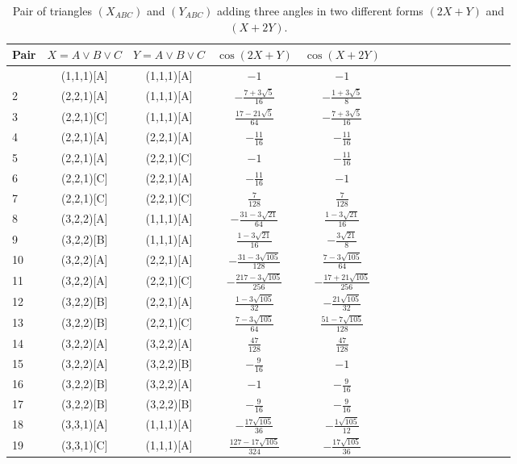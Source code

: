 \documentclass[11pt]{article}
\begin{document}
\begin{longtable}{ | p{1cm}| *{15}{c|} }
\caption{Pair of triangles $(X_{ABC})$ and $(Y_{ABC})$ adding three angles 
in two different forms $(2X+Y)$ and $(X+2Y)$.}\\
\hline
Pair & $X = A \lor B \lor C$ & $Y = A \lor B \lor C$ & $\cos(2X+Y)$ & $\cos(X+2Y)$ \\
\hline\endhead
\hline\endfoot
1 & (1,1,1)[A] & (1,1,1)[A] & $-1$ & $-1$\\
2 & (2,2,1)[A] & (1,1,1)[A] & $-\frac{7+3\sqrt{5}}{16}$ & $-\frac{1+3\sqrt{5}}{8}$\\
3 & (2,2,1)[C] & (1,1,1)[A] & $\frac{17-21\sqrt{5}}{64}$ & $-\frac{7+3\sqrt{5}}{16}$\\
4 & (2,2,1)[A] & (2,2,1)[A] & $-\frac{11}{16}$ & $-\frac{11}{16}$\\
5 & (2,2,1)[A] & (2,2,1)[C] & $-1$ & $-\frac{11}{16}$\\
6 & (2,2,1)[C] & (2,2,1)[A] & $-\frac{11}{16}$ & $-1$\\
7 & (2,2,1)[C] & (2,2,1)[C] & $\frac{7}{128}$ & $\frac{7}{128}$\\
8 & (3,2,2)[A] & (1,1,1)[A] & $-\frac{31-3\sqrt{21}}{64}$ & $\frac{1-3\sqrt{21}}{16}$\\
9 & (3,2,2)[B] & (1,1,1)[A] & $\frac{1-3\sqrt{21}}{16}$ & $-\frac{3\sqrt{21}}{8}$\\
10 & (3,2,2)[A] & (2,2,1)[A] & $-\frac{31-3\sqrt{105}}{128}$ & $\frac{7-3\sqrt{105}}{64}$\\
11 & (3,2,2)[A] & (2,2,1)[C] & $-\frac{217-3\sqrt{105}}{256}$ & $-\frac{17+21\sqrt{105}}{256}$\\
12 & (3,2,2)[B] & (2,2,1)[A] & $\frac{1-3\sqrt{105}}{32}$ & $-\frac{21\sqrt{105}}{32}$\\
13 & (3,2,2)[B] & (2,2,1)[C] & $\frac{7-3\sqrt{105}}{64}$ & $\frac{51-7\sqrt{105}}{128}$\\
14 & (3,2,2)[A] & (3,2,2)[A] & $\frac{47}{128}$ & $\frac{47}{128}$\\
15 & (3,2,2)[A] & (3,2,2)[B] & $-\frac{9}{16}$ & $-1$\\
16 & (3,2,2)[B] & (3,2,2)[A] & $-1$ & $-\frac{9}{16}$\\
17 & (3,2,2)[B] & (3,2,2)[B] & $-\frac{9}{16}$ & $-\frac{9}{16}$\\
18 & (3,3,1)[A] & (1,1,1)[A] & $-\frac{17\sqrt{105}}{36}$ & $-\frac{1\sqrt{105}}{12}$\\
19 & (3,3,1)[C] & (1,1,1)[A] & $\frac{127-17\sqrt{105}}{324}$ & $-\frac{17\sqrt{105}}{36}$\\

\end{longtable}
\end{document}
